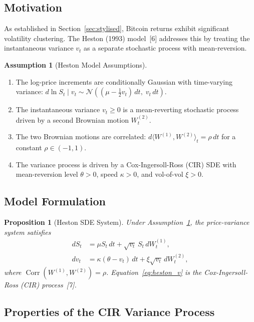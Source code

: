 \documentclass[12pt, a4paper, oneside]{report}
\theoremstyle{plain}
\newtheorem{proposition}[theorem]{Proposition}
\theoremstyle{definition}
\newtheorem{assumption}[theorem]{Assumption}
\theoremstyle{remark}
\begin{document}
\subsection{Motivation}

As established in Section~\ref{sec:stylised}, Bitcoin returns exhibit significant
volatility clustering.  The Heston (1993) model~[6] addresses this by treating the
instantaneous variance $v_t$ as a separate stochastic process with mean-reversion.

\begin{assumption}[Heston Model Assumptions]
\label{ass:heston}
\begin{enumerate}[leftmargin=1.25cm, label=\textup{(H\arabic*)}]
  \item The log-price increments are conditionally Gaussian with time-varying variance:
    $d\ln S_t \mid v_t \sim \mathcal{N}((\mu - \frac{1}{2}v_t)\,dt,\; v_t\,dt)$.
  \item The instantaneous variance $v_t \geq 0$ is a mean-reverting stochastic process
    driven by a second Brownian motion $W_t^{(2)}$.
  \item The two Brownian motions are correlated:
    $d\langle W^{(1)}, W^{(2)}\rangle_t = \rho\,dt$ for a constant $\rho \in (-1,1)$.
  \item The variance process is driven by a Cox-Ingersoll-Ross (CIR) SDE with
    mean-reversion level $\theta > 0$, speed $\kappa > 0$, and vol-of-vol $\xi > 0$.
\end{enumerate}
\end{assumption}

\subsection{Model Formulation}

\begin{proposition}[Heston SDE System]
\label{prop:heston_sde}
Under Assumption~\ref{ass:heston}, the price-variance system satisfies
\begin{align}
  dS_t &= \mu S_t\,dt + \sqrt{v_t}\,S_t\,dW_t^{(1)}, \label{eq:heston_s}\\
  dv_t &= \kappa(\theta - v_t)\,dt + \xi\sqrt{v_t}\,dW_t^{(2)}, \label{eq:heston_v}
\end{align}
where $\operatorname{Corr}(W^{(1)}, W^{(2)}) = \rho$.  Equation~\eqref{eq:heston_v}
is the Cox-Ingersoll-Ross (CIR) process~[7].
\end{proposition}

\subsection{Properties of the CIR Variance Process}
\end{document}
